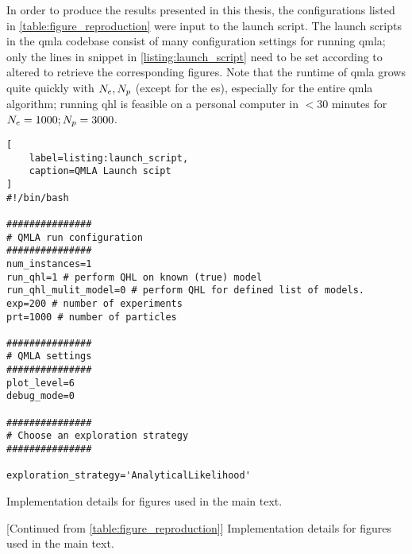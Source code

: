In order to produce the results presented in this thesis, 
    the configurations listed in \cref{table:figure_reproduction} were input to the launch script.
The launch scripts in the \gls{qmla} codebase consist of many configuration settings for running \gls{qmla};
    only the lines in snippet in \cref{listing:launch_script} need to be set according to 
    altered to retrieve  the corresponding figures.
Note that the runtime of \gls{qmla} grows quite quickly with $N_e, N_p$ (except for the  \gls{es}), 
    especially for the entire \gls{qmla} algorithm; running \gls{qhl} is feasible on a personal computer in 
    $<30$ minutes for $N_e=1000; N_p=3000$. 

\begin{lstlisting}[
    label=listing:launch_script,
    caption=QMLA Launch scipt
]
#!/bin/bash

###############
# QMLA run configuration
###############
num_instances=1
run_qhl=1 # perform QHL on known (true) model
run_qhl_mulit_model=0 # perform QHL for defined list of models.
exp=200 # number of experiments
prt=1000 # number of particles

###############
# QMLA settings
###############
plot_level=6
debug_mode=0

###############
# Choose an exploration strategy 
###############

exploration_strategy='AnalyticalLikelihood'

\end{lstlisting}


\renewcommand{\arraystretch}{1.25} %
\setlength{\tabcolsep}{5pt}

\clearpage
\begin{table}[h!]
    \begin{center}
        
    \end{center}
    \caption[Figure implementation details]{Implementation details for figures used in the main text.}
    \label{table:figure_reproduction}
\end{table}

\clearpage
\begin{table}[h!]
        \begin{center}
            
        \end{center}
        \caption[Figure implementation details continued]{[Continued from \cref{table:figure_reproduction}] Implementation details for figures used in the main text.}
        \label{table:figure_reproduction_contd}
\end{table}
    
\clearpage
